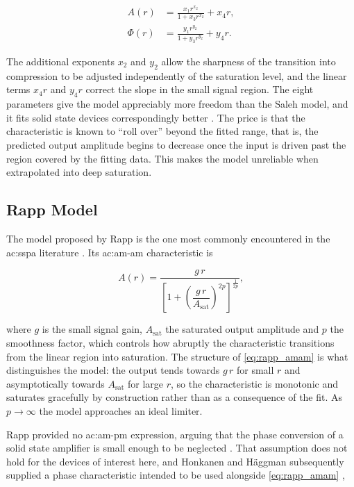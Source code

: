 \begin{align}
  A(r)    &= \frac{x_1 r^{x_2}}{1 + x_3 r^{x_2}} + x_4 r, \label{eq:ghorbani_amam} \\
  \Phi(r) &= \frac{y_1 r^{y_2}}{1 + y_3 r^{y_2}} + y_4 r. \label{eq:ghorbani_ampm}
\end{align}

The additional exponents $x_2$ and $y_2$ allow the sharpness of the transition into compression to be adjusted independently of the saturation level, and the linear terms $x_4 r$ and $y_4 r$ correct the slope in the small signal region. The eight parameters give the model appreciably more freedom than the Saleh model, and it fits solid state devices correspondingly better \cite{fisher}. The price is that the characteristic is known to ``roll over'' beyond the fitted range, that is, the predicted output amplitude begins to decrease once the input is driven past the region covered by the fitting data. This makes the model unreliable when extrapolated into deep saturation.

\subsection{Rapp Model}\label{sec:rapp_model}

The model proposed by Rapp is the one most commonly encountered in the \gls{ac:sspa} literature \cite{rapp}. Its \gls{ac:am-am} characteristic is

\begin{equation}
  A(r) = \frac{g\,r}{\left[1 + \left(\dfrac{g\,r}{A_{\text{sat}}}\right)^{2p}\right]^{\frac{1}{2p}}},
  \label{eq:rapp_amam}
\end{equation}

where $g$ is the small signal gain, $A_{\text{sat}}$ the saturated output amplitude and $p$ the smoothness factor, which controls how abruptly the characteristic transitions from the linear region into saturation. The structure of \eqref{eq:rapp_amam} is what distinguishes the model: the output tends towards $g\,r$ for small $r$ and asymptotically towards $A_{\text{sat}}$ for large $r$, so the characteristic is monotonic and saturates gracefully by construction rather than as a consequence of the fit. As $p \rightarrow \infty$ the model approaches an ideal limiter.

Rapp provided no \gls{ac:am-pm} expression, arguing that the phase conversion of a solid state amplifier is small enough to be neglected \cite{rapp}. That assumption does not hold for the devices of interest here, and Honkanen and H\"aggman subsequently supplied a phase characteristic intended to be used alongside \eqref{eq:rapp_amam} \cite{honkanen},

